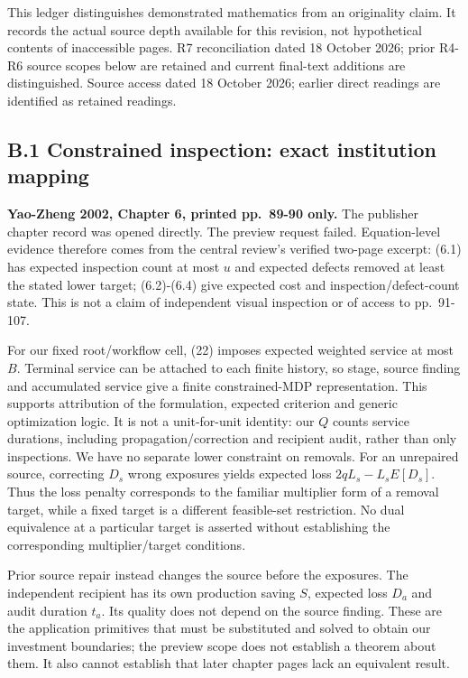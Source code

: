 \documentclass[
  11pt,
  a4paper,
]{article}
\begin{document}
This ledger distinguishes demonstrated mathematics from an originality
claim. It records the actual source depth available for this revision,
not hypothetical contents of inaccessible pages. R7 reconciliation dated
18 October 2026; prior R4-R6 source scopes below are retained and
current final-text additions are distinguished. Source access dated 18
October 2026; earlier direct readings are identified as retained
readings.

\hypertarget{b.1-constrained-inspection-exact-institution-mapping}{%
\subsection{B.1 Constrained inspection: exact institution
mapping}\label{b.1-constrained-inspection-exact-institution-mapping}}

\textbf{Yao-Zheng 2002, Chapter 6, printed pp.~89-90 only.} The
publisher chapter record was opened directly. The preview request
failed. Equation-level evidence therefore comes from the central
review's verified two-page excerpt: (6.1) has expected inspection count
at most \(u\) and expected defects removed at least the stated lower
target; (6.2)-(6.4) give expected cost and inspection/defect-count
state. This is not a claim of independent visual inspection or of access
to pp.~91-107.

For our fixed root/workflow cell, (22) imposes expected weighted service
at most \(B\). Terminal service can be attached to each finite history,
so stage, source finding and accumulated service give a finite
constrained-MDP representation. This supports attribution of the
formulation, expected criterion and generic optimization logic. It is
not a unit-for-unit identity: our \(Q\) counts service durations,
including propagation/correction and recipient audit, rather than only
inspections. We have no separate lower constraint on removals. For an
unrepaired source, correcting \(D_s\) wrong exposures yields expected
loss \(2qL_s-L_sE[D_s]\). Thus the loss penalty corresponds to the
familiar multiplier form of a removal target, while a fixed target is a
different feasible-set restriction. No dual equivalence at a particular
target is asserted without establishing the corresponding
multiplier/target conditions.

Prior source repair instead changes the source before the exposures. The
independent recipient has its own production saving \(S\), expected loss
\(D_a\) and audit duration \(t_a\). Its quality does not depend on the
source finding. These are the application primitives that must be
substituted and solved to obtain our investment boundaries; the preview
scope does not establish a theorem about them. It also cannot establish
that later chapter pages lack an equivalent result.
\end{document}

